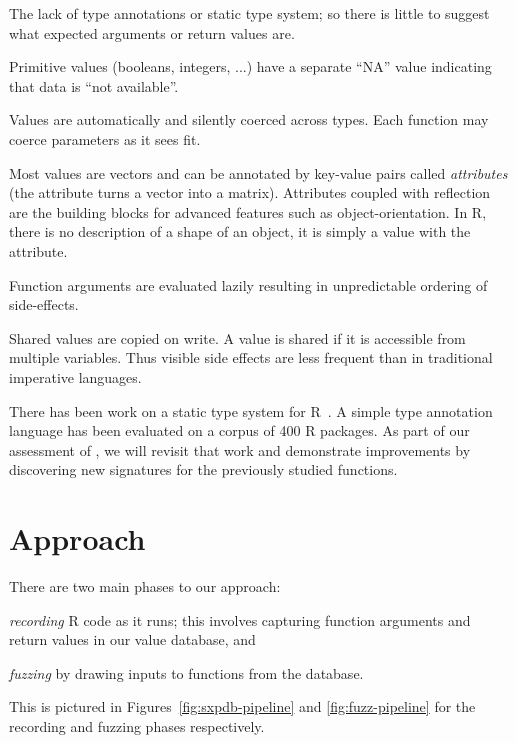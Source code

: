 \documentclass[sigplan,nonacm,anonymous,review]{acmart}
\begin{document}
\begin{compactitem}[$-$]
\item The lack of type annotations or static type system; so there is
  little to suggest what expected arguments or return values are.
\item Primitive values (booleans, integers, ...)  have a separate
  ``NA'' value indicating that data is ``not available''.
\item Values are automatically and silently coerced across types.
  Each function may coerce parameters as it sees fit.
\item Most values are vectors and can be annotated by key-value pairs
  called \textit{attributes} (\Eg the  attribute turns a vector into a matrix).
  Attributes coupled with reflection are
  the building blocks for advanced features such as
  object-orientation.  In R, there is no description of a shape of an
  object, it is simply a value with the  attribute.
\item Function arguments are evaluated lazily resulting in unpredictable
  ordering of side-effects.
\item Shared values are copied on write. A value is shared if it is
  accessible from multiple variables. Thus visible side effects are less
  frequent than in traditional imperative languages.
\end{compactitem}

\bigskip
There has been work on a static type system for
R~\cite{turcotte2020designing}.  A simple type annotation language has
been evaluated on a corpus of 400 R packages.  As part of our
assessment of \tool, we will revisit that work and demonstrate improvements
by discovering new signatures for the previously studied functions.

\section{Approach}

There are two main phases to our approach:
%
\begin{inparaenum}[(1)]
\item \emph{recording} R code as it runs; this involves capturing
  function arguments and return values in our value database, and
\item \emph{fuzzing} by drawing inputs to functions from the database.
\end{inparaenum}
This is pictured in Figures~\ref{fig:sxpdb-pipeline} and
\ref{fig:fuzz-pipeline} for the recording and fuzzing phases
respectively.
\end{document}
